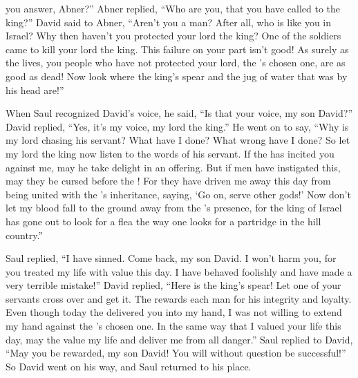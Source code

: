 {you answer,
Abner?” Abner
replied,
“Who
are you, that you
have called
to
the king?”
David
said
to
Abner,
“Aren’t you
a man? After all, who
is like
you in Israel? Why
then haven’t
you protected
your lord
the king? One
of the soldiers
came
to kill
your lord
the king.
This
failure
on your part isn’t
good! As surely
as the
{}
lives,
you people who
have not
protected
your lord,
the
{}’s
chosen one,
are as good as dead! Now
look
where
the king’s
spear
and the
jug
of water
that
was by his head are!”
\par }{\PP {}When Saul
recognized
David’s
voice,
he said,
“Is that your voice,
my son
David?” David
replied,
“Yes, it’s my voice,
my lord
the king.”
He went on to say,
“Why
is
my lord
chasing
his servant? What
have I done? What
wrong have I done?
So let
my lord
the king
now
listen
to the words
of his servant.
If
the {}
has incited
you against me, may he take delight
in an offering.
But if
men
have instigated this, may they
be cursed
before
the {}! For
they have driven
me away
this day
from being united
with the
{}’s
inheritance,
saying,
‘Go
on, serve
other
gods!’
Now
don’t
let my blood
fall
to the ground
away from the
{}’s
presence,
for
the king
of Israel
has gone out
to look
for a flea
the way one
looks for a partridge
in the hill country.”
\par }{\PP {}Saul
replied,
“I have sinned.
Come back,
my son
David.
I won’t
harm
you, for you treated my life
with value
this
day.
I have behaved foolishly
and have made a very
terrible
mistake!”
David
replied,
“Here
is the king’s
spear! Let one
of your servants
cross
over and get it.
The
{}
rewards each man
for his integrity
and loyalty.
Even though today
the {}
delivered
you into my hand,
I was not
willing
to extend
my hand
against the
{}’s
chosen one.
In the same way that
I valued
your life
this
day,
may
the {}
value
my life
and deliver
me from all
danger.”
Saul
replied
to
David,
“May you
be rewarded,
my son
David! You will without question
be successful!” So David
went
on his way,
and Saul
returned
to his place.

}
